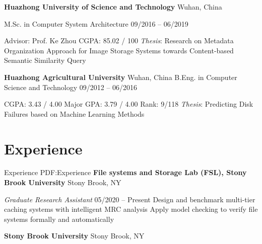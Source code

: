\documentclass[letterpaper,10pt,oneside]{article}
\begin{document}
\begin{body}
\BigGap

{\textbf{Huazhong University of Science and Technology}}
\hfill
Wuhan, China

\GapNoBreak
\BulletItem
M.Sc. in
{Computer System Architecture}
\hfill
09/2016 -- 06/2019
\begin{detail}
\BulletItem
Advisor: Prof. Ke Zhou
\BulletItem
CGPA: 85.02 / 100 
\BulletItem
\emph{Thesis}: Research on Metadata Organization Approach for Image Storage Systems towards Content-based Semantic Similarity Query
\end{detail}

\BigGap
{\textbf{Huazhong Agricultural University}}
\hfill
Wuhan, China
\GapNoBreak
\BulletItem
B.Eng. in
{Computer Science and Technology}
\hfill
09/2012 -- 06/2016
\begin{detail}
\BulletItem
CGPA: 3.43 / 4.00 \quad Major GPA: 3.79 / 4.00 \quad Rank: 9/118
\BulletItem
\emph{Thesis}: Predicting Disk Failures based on Machine Learning Methods
\end{detail}


\section
{Experience}
{Experience}
{PDF:Experience}
{\textbf{File systems and Storage Lab (FSL), Stony Brook University}}
\hfill
Stony Brook, NY

\emph{Graduate Research Assistant}
\hfill
05/2020 --
Present
\GapNoBreak
\BulletItem
Design and benchmark multi-tier caching systems with intelligent MRC analysis
\GapNoBreak
\BulletItem
Apply model checking to verify file systems formally and automatically

\BigGap
{\textbf{Stony Brook University}}
\hfill
Stony Brook, NY


\end{body}
\end{document}

